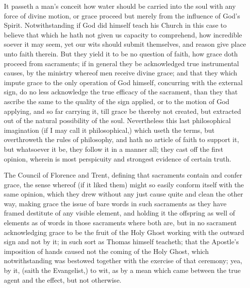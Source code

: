 It passeth a man’s conceit how water should be carried into the soul with any force of divine motion, or grace proceed but merely from the influence of God’s Spirit. Notwithstanding if God did himself teach his Church in this case to believe that which he hath not given us capacity to comprehend, how incredible soever it may seem, yet our wits should submit themselves, and reason give place unto faith therein. But they yield it to be no question of faith, how grace doth proceed from sacraments; if in general they be acknowledged true instrumental causes, by the ministry whereof men receive divine grace; and that they which impute grace to the only operation of God himself, concurring with the external sign, do no less acknowledge the true efficacy of the sacrament, than they that ascribe the same to the quality of the sign  applied, or to the motion of God applying, and so far carrying it, till grace be thereby not created, but extracted out of the natural possibility of the soul. Nevertheless this last philosophical imagination (if I may call it philosophical,) which useth the terms, but overthroweth the rules of philosophy, and hath no article of faith to support it, but whatsoever it be, they follow it in a manner all; they cast off the first opinion, wherein is most perspicuity and strongest evidence of certain truth.

The Council of Florence and Trent, defining that sacraments contain and confer grace, the sense whereof (if it liked them) might so easily conform itself with the same opinion, which they drew without any just cause quite and clean the other way, making grace the issue of bare words in such sacraments as they have framed destitute of any visible element, and holding it the offspring as well of elements as of words in those sacraments where both are, but in no sacrament acknowledging grace to be the fruit of the Holy Ghost working with the outward sign and not by it; in such sort as Thomas himself teacheth; that the Apostle’s imposition of hands caused not the coming of the Holy Ghost, which notwithstanding was bestowed together with the exercise of that ceremony; yea, by it, (saith the Evangelist,) to wit, as by a mean which came between the true agent and the effect, but not otherwise.

